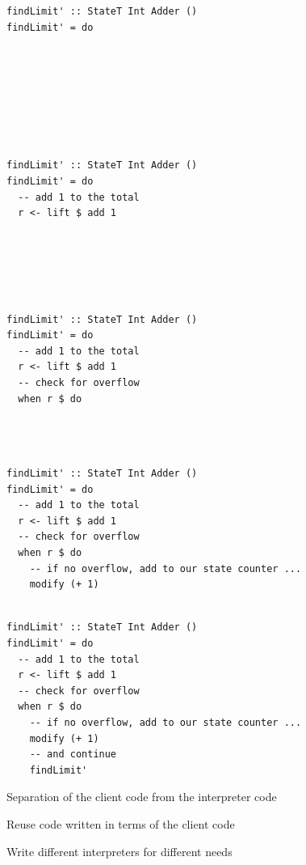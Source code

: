 \documentclass{beamer}
\begin{document}
\begin{frame}[fragile]
  \begin{overprint}
  \begin{verbatim}
findLimit' :: StateT Int Adder ()
findLimit' = do








  \end{verbatim}
  \begin{verbatim}
findLimit' :: StateT Int Adder ()
findLimit' = do
  -- add 1 to the total
  r <- lift $ add 1






  \end{verbatim}
  \begin{verbatim}
findLimit' :: StateT Int Adder ()
findLimit' = do
  -- add 1 to the total
  r <- lift $ add 1
  -- check for overflow
  when r $ do




  \end{verbatim}
  \begin{verbatim}
findLimit' :: StateT Int Adder ()
findLimit' = do
  -- add 1 to the total
  r <- lift $ add 1
  -- check for overflow
  when r $ do
    -- if no overflow, add to our state counter ...
    modify (+ 1)


  \end{verbatim}
  \begin{verbatim}
findLimit' :: StateT Int Adder ()
findLimit' = do
  -- add 1 to the total
  r <- lift $ add 1
  -- check for overflow
  when r $ do
    -- if no overflow, add to our state counter ...
    modify (+ 1)
    -- and continue
    findLimit'
  \end{verbatim}
  \end{overprint}
\end{frame}

\begin{frame}[c]
  \centering
  Separation of the client code from the interpreter code
\end{frame}

\begin{frame}[c]
  \centering
  Reuse code written in terms of the client code
\end{frame}

\begin{frame}[c]
  \centering
  Write different interpreters for different needs
\end{frame}
\end{document}
